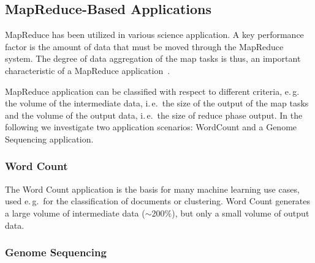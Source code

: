 \documentclass{acm_proc_article-sp}
\newcommand{\pnote}[1]{ {\textcolor{magenta} { ***pradeep: #1 }}}
\newcommand{\pnote}[1]{}
\begin{document}
\subsection{MapReduce-Based Applications}

MapReduce has been utilized in various science application. A key performance 
factor is the amount of data that must be moved through the MapReduce system. 
The degree of data aggregation of the map tasks is thus, an important 
characteristic of a MapReduce application~\cite{weissman-mr-11}.

MapReduce application can be classified with respect to different criteria,
e.\,g.\, the volume of the intermediate data, i.\,e.\ the size of the output
of the map tasks and the volume of the output data, i.\,e.\ the size of reduce
phase output. In the following we investigate two application scenarios: 
WordCount and a Genome Sequencing application.


\subsubsection*{Word Count}

The Word Count application is the basis for many machine learning use cases, 
used e.\,g.\ for the classification of documents or clustering. Word Count 
generates a large volume of intermediate data ($\sim$200$\%$), but only a 
small volume of output data.


\subsubsection*{Genome Sequencing}
\end{document}
